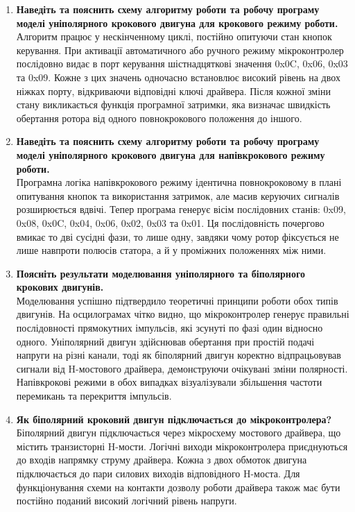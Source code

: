\documentclass[14pt, a4paper]{extreport}
\begin{document}
\begin{enumerate}
		\item \textbf{Наведіть та пояснить схему алгоритму роботи та робочу програму моделі уніполярного крокового двигуна для крокового режиму роботи.} \\ Алгоритм працює у нескінченному циклі, постійно опитуючи стан кнопок керування. При активації автоматичного або ручного режиму мікроконтролер послідовно видає в порт керування шістнадцяткові значення 0x0C, 0x06, 0x03 та 0x09. Кожне з цих значень одночасно встановлює високий рівень на двох ніжках порту, відкриваючи відповідні ключі драйвера. Після кожної зміни стану викликається функція програмної затримки, яка визначає швидкість обертання ротора від одного повнокрокового положення до іншого.
		
		\item \textbf{Наведіть та пояснить схему алгоритму роботи та робочу програму моделі уніполярного крокового двигуна для напівкрокового режиму роботи.} \\ Програмна логіка напівкрокового режиму ідентична повнокроковому в плані опитування кнопок та використання затримок, але масив керуючих сигналів розширюється вдвічі. Тепер програма генерує вісім послідовних станів: 0x09, 0x08, 0x0C, 0x04, 0x06, 0x02, 0x03 та 0x01. Ця послідовність почергово вмикає то дві сусідні фази, то лише одну, завдяки чому ротор фіксується не лише навпроти полюсів статора, а й у проміжних положеннях між ними.
		
		\item \textbf{Поясніть результати моделювання уніполярного та біполярного крокових двигунів.} \\ Моделювання успішно підтвердило теоретичні принципи роботи обох типів двигунів. На осцилограмах чітко видно, що мікроконтролер генерує правильні послідовності прямокутних імпульсів, які зсунуті по фазі один відносно одного. Уніполярний двигун здійснював обертання при простій подачі напруги на різні канали, тоді як біполярний двигун коректно відпрацьовував сигнали від H-мостового драйвера, демонструючи очікувані зміни полярності. Напівкрокові режими в обох випадках візуалізували збільшення частоти перемикань та перекриття імпульсів.
		
		\item \textbf{Як біполярний кроковий двигун підключається до мікроконтролера?} \\ Біполярний двигун підключається через мікросхему мостового драйвера, що містить транзисторні H-мости. Логічні виходи мікроконтролера приєднуються до входів напрямку струму драйвера. Кожна з двох обмоток двигуна підключається до пари силових виходів відповідного H-моста. Для функціонування схеми на контакти дозволу роботи драйвера також має бути постійно поданий високий логічний рівень напруги.
		

\end{enumerate}
\end{document}
